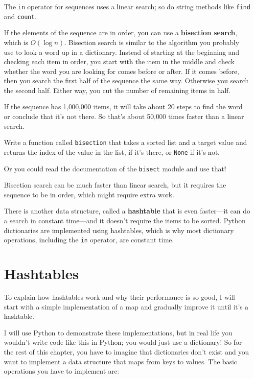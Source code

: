\documentclass[10pt]{book}
\begin{document}
The {\tt in} operator for sequences uses a linear search; so do string
methods like {\tt find} and {\tt count}.

If the elements of the sequence are in order, you can use a {\bf
  bisection search}, which is $O(\log n)$.  Bisection search is
similar to the algorithm you probably use to look a word up in a
dictionary.  Instead of starting at the beginning and checking each
item in order, you start with the item in the middle and check whether
the word you are looking for comes before or after.  If it comes
before, then you search the first half of the sequence the same way.
Otherwise you search the second half.  Either way, you cut the number
of remaining items in half.

If the sequence has 1,000,000 items, it will take about 20 steps to
find the word or conclude that it's not there.  So that's about 50,000
times faster than a linear search.

\begin{ex}

Write a function called {\tt bisection} that takes a sorted list
and a target value and returns the index of the value
in the list, if it's there, or {\tt None} if it's not.


Or you could read the documentation of the {\tt bisect} module
and use that!

\end{ex}

Bisection search can be much faster than linear search, but
it requires the sequence to be in order, which might require
extra work.

There is another data structure, called a {\bf hashtable} that
is even faster---it can do a search in constant time---and it
doesn't require the items to be sorted.  Python dictionaries
are implemented using hashtables, which is why most dictionary
operations, including the {\tt in} operator, are constant time.

\section{Hashtables}
\label{hashtable}

To explain how hashtables work and why their performance is so
good, I will start with a simple implementation of a map and
gradually improve it until it's a hashtable.

I will use Python to demonstrate these implementations, but in real
life you wouldn't write code like this in Python; you would just use a
dictionary!  So for the rest of this chapter, you have to imagine that
dictionaries don't exist and you want to implement a data structure
that maps from keys to values.  The basic operations you have to
implement are:
\end{document}
